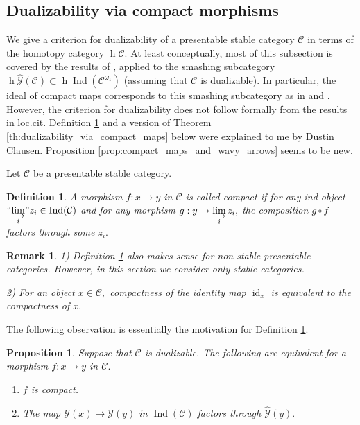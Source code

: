 \documentclass[11pt,leqno]{amsart}
\newtheorem{defi}[theo]{Definition}
\newtheorem{prop}[theo]{Proposition}
\newtheorem{remark}[theo]{Remark}
\numberwithin{equation}{section}
\def\h{\operatorname{h}}
\newcommand{\indlim}[1][]{\mathop{\varinjlim}\limits_{#1}}
\newcommand{\inddlim}[1][]{{``{\indlim[#1]}"}}
\newcommand{\cC}{{\mathcal C}}
\newcommand{\cY}{{\mathcal Y}}
\newcommand{\Ind}{\operatorname{Ind}}
\newcommand{\id}{\operatorname{id}}
\begin{document}
\subsection{Dualizability via compact morphisms}
\label{ssec:dual_via_compact}

We give a criterion for dualizability of a presentable stable category $\cC$ in terms of the homotopy category $\h\cC.$ At least conceptually, most of this subsection is covered by the results of \cite{Kr00, Kr05}, applied to the smashing subcategory $\h\hat{\cY}(\cC)\subset\h\Ind(\cC^{\omega_1})$ (assuming that $\cC$ is dualizable). In particular, the ideal of compact maps corresponds to this smashing subcategory as in \cite[Theorem A]{Kr00} and \cite[Theorem 1]{Kr05}. However, the criterion for dualizability does not follow formally from the results in loc.cit. Definition \ref{defi:compact_morphism} and a version of Theorem \ref{th:dualizability_via_compact_maps} below were explained to me by Dustin Clausen. Proposition \ref{prop:compact_maps_and_wavy_arrows} seems to be new.

Let $\cC$ be a presentable stable category. 

\begin{defi}\label{defi:compact_morphism} A morphism $f:x\to y$ in $\cC$ is called compact if for any ind-object $\inddlim[i]z_i\in\Ind(\cC)$ and for any morphism $g:y\to \indlim[i]z_i,$ the composition $g\circ f$ factors through some $z_i.$\end{defi}

\begin{remark}1) Definition \ref{defi:compact_morphism} also makes sense for non-stable presentable categories. However, in this section we consider only stable categories.

2) For an object $x\in\cC,$ compactness of the identity map $\id_x$ is equivalent to the compactness of $x.$
\end{remark}

The following observation is essentially the motivation for Definition \ref{defi:compact_morphism}.

\begin{prop}\label{prop:compact_maps_in_dualizable_cats} Suppose that $\cC$ is dualizable. The following are equivalent for a morphism $f:x\to y$ in $\cC.$

\begin{enumerate}[label=(\roman*),ref=(\roman*)]
\item $f$ is compact. \label{comp1}

\item The map $\cY(x)\to\cY(y)$ in $\Ind(\cC)$ factors through $\hat{\cY}(y).$ \label{comp2}
\end{enumerate}
\end{prop}
\end{document}
